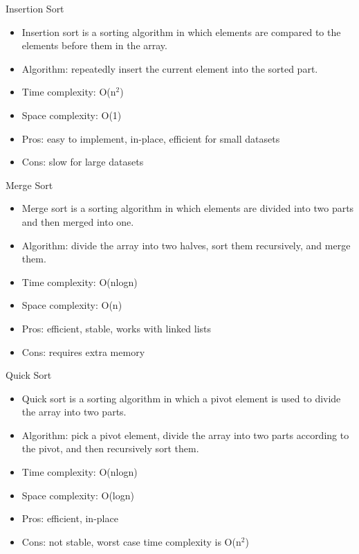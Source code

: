 \documentclass{beamer}
\begin{document}
\begin{frame}{Insertion Sort}
\begin{itemize}
    \item Insertion sort is a sorting algorithm in which elements are compared to the elements before them in the array. 
    \item Algorithm: repeatedly insert the current element into the sorted part. 
    \item Time complexity: O(n$^2$) 
    \item Space complexity: O(1) 
    \item Pros: easy to implement, in-place, efficient for small datasets 
    \item Cons: slow for large datasets 
\end{itemize}
\end{frame}

\begin{frame}{Merge Sort}
\begin{itemize}
    \item Merge sort is a sorting algorithm in which elements are divided into two parts and then merged into one. 
    \item Algorithm: divide the array into two halves, sort them recursively, and merge them.
    \item Time complexity: O(nlogn) 
    \item Space complexity: O(n) 
    \item Pros: efficient, stable, works with linked lists 
    \item Cons: requires extra memory 
\end{itemize}
\end{frame}

\begin{frame}{Quick Sort}
\begin{itemize}
    \item Quick sort is a sorting algorithm in which a pivot element is used to divide the array into two parts. 
    \item Algorithm: pick a pivot element, divide the array into two parts according to the pivot, and then recursively sort them. 
    \item Time complexity: O(nlogn) 
    \item Space complexity: O(logn) 
    \item Pros: efficient, in-place 
    \item Cons: not stable, worst case time complexity is O(n$^2$)
\end{itemize}
\end{frame}
\end{document}
